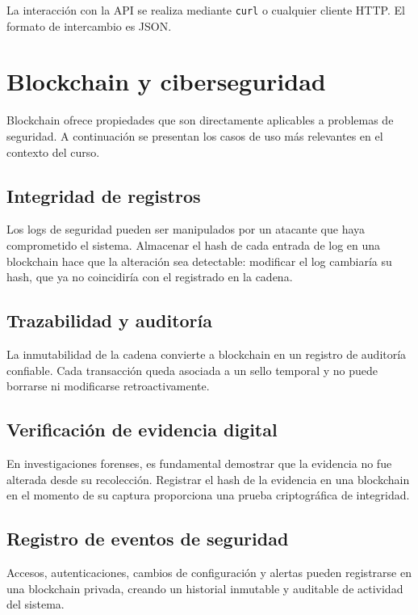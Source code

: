 \documentclass[
  coursetitle={Cómputo Nube y Tecnologías Emergentes},
  coursehours={96},
  coursedate={Verano 2026},
  doctype={Notas de clase},
  otherlangs={english,french},
  authorname={Lázaro},
  authorsurname={Bustio-Martínez},
  authortitle={PhD},
  role={Profesor Investigador},
  email={lbustio@inaoe.mx},
  phone={5559504000},
  ext={7459},
  institution={Instituto Nacional de Astrofísica, Óptica y Electrónica (INAOE)},
  department={Maestría en Ciencias en Tecnologías de Seguridad},
  address={Luis Enrique Erro 1, Sta. Ma. Tonantzintla, San Andrés Cholula, CP 72840, Puebla, México},
  margin={0.5in}
]{../../lbustio_lecture_notes}
\begin{document}
La interacción con la API se realiza mediante \texttt{curl} o cualquier cliente HTTP. El formato de intercambio es JSON.

\section{Blockchain y ciberseguridad}

Blockchain ofrece propiedades que son directamente aplicables a problemas de seguridad. A continuación se presentan los casos de uso más relevantes en el contexto del curso.

\subsection{Integridad de registros}

Los logs de seguridad pueden ser manipulados por un atacante que haya comprometido el sistema. Almacenar el hash de cada entrada de log en una blockchain hace que la alteración sea detectable: modificar el log cambiaría su hash, que ya no coincidiría con el registrado en la cadena.

\subsection{Trazabilidad y auditoría}

La inmutabilidad de la cadena convierte a blockchain en un registro de auditoría confiable. Cada transacción queda asociada a un sello temporal y no puede borrarse ni modificarse retroactivamente.

\subsection{Verificación de evidencia digital}

En investigaciones forenses, es fundamental demostrar que la evidencia no fue alterada desde su recolección. Registrar el hash de la evidencia en una blockchain en el momento de su captura proporciona una prueba criptográfica de integridad.

\subsection{Registro de eventos de seguridad}

Accesos, autenticaciones, cambios de configuración y alertas pueden registrarse en una blockchain privada, creando un historial inmutable y auditable de actividad del sistema.
\end{document}
